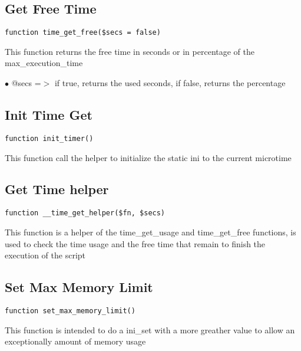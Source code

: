 \documentclass[a4paper]{book}
\begin{document}
\hypertarget{toc203}{}
\subsection{Get Free Time}

\begin{lstlisting}
function time_get_free($secs = false)
\end{lstlisting}

This function returns the free time in seconds or in percentage of the max\_execution\_time

\begin{compactitem}
\item[\color{myblue}$\bullet$] @secs =$>$ if true, returns the used seconds, if false, returns the percentage
\end{compactitem}

\hypertarget{toc204}{}
\subsection{Init Time Get}

\begin{lstlisting}
function init_timer()
\end{lstlisting}

This function call the helper to initialize the static ini to the current microtime

\hypertarget{toc205}{}
\subsection{Get Time helper}

\begin{lstlisting}
function __time_get_helper($fn, $secs)
\end{lstlisting}

This function is a helper of the time\_get\_usage and time\_get\_free functions, is used to
check the time usage and the free time that remain to finish the execution of the script

\hypertarget{toc206}{}
\subsection{Set Max Memory Limit}

\begin{lstlisting}
function set_max_memory_limit()
\end{lstlisting}

This function is intended to do a ini\_set with a more greather value to allow an
exceptionally amount of memory usage
\end{document}
